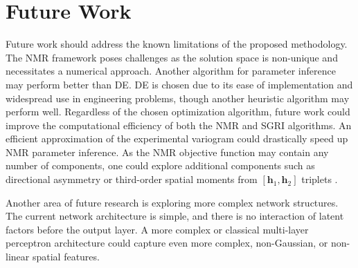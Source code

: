 \FloatBarrier
\section{Future Work}
\label{sec:07fwork}

Future work should address the known limitations of the proposed methodology. The \gls{NMR} framework poses challenges as the solution space is non-unique and necessitates a numerical approach. Another algorithm for parameter inference may perform better than \gls{DE}. \Gls{DE} is chosen due to its ease of implementation and widespread use in engineering problems, though another heuristic algorithm may perform well. Regardless of the chosen optimization algorithm, future work could improve the computational efficiency of both the \gls{NMR} and \gls{SGRI} algorithms. An efficient approximation of the experimental variogram could drastically speed up \gls{NMR} parameter inference. As the \gls{NMR} objective function may contain any number of components, one could explore additional components such as directional asymmetry or third-order spatial moments from $[\mathbf{h}_{1}, \mathbf{h}_{2}]$ triplets \citep{lauzon2020sequential}.

Another area of future research is exploring more complex network structures. The current network architecture is simple, and there is no interaction of latent factors before the output layer. A more complex or classical multi-layer perceptron architecture could capture even more complex, non-Gaussian, or non-linear spatial features.


